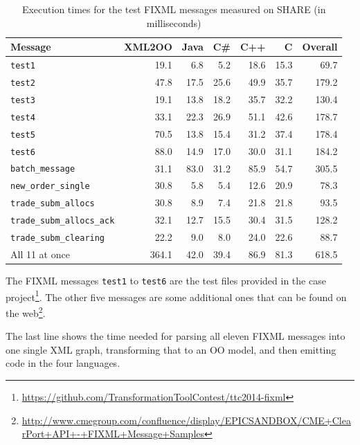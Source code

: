 \documentclass[a4paper]{article}
\begin{document}
\begin{table}[h!t]
  \centering
  \begin{tabular}{| l | r | r | r | r | r | r |}
    \hline
    \textbf{Message} & \textbf{XML2OO} & \textbf{Java} & \textbf{C\#} & \textbf{C++} & \textbf{C} & \textbf{Overall}\\
    \hline
    \texttt{test1}                    & 19.1  & 6.8  & 5.2  & 18.6 & 15.3 & 69.7\\
    \texttt{test2}                    & 47.8  & 17.5 & 25.6 & 49.9 & 35.7 & 179.2\\
    \texttt{test3}                    & 19.1  & 13.8 & 18.2 & 35.7 & 32.2 & 130.4\\
    \texttt{test4}                    & 33.1  & 22.3 & 26.9 & 51.1 & 42.6 & 178.7\\
    \texttt{test5}                    & 70.5  & 13.8 & 15.4 & 31.2 & 37.4 & 178.4\\
    \texttt{test6}                    & 88.0  & 14.9 & 17.0 & 30.0 & 31.1 & 184.2\\
    \hline
    \texttt{batch\_message}           & 31.1  & 83.0 & 31.2 & 85.9 & 54.7 & 305.5\\
    \texttt{new\_order\_single}       & 30.8  & 5.8  & 5.4  & 12.6 & 20.9 & 78.3\\
    \texttt{trade\_subm\_allocs}      & 30.8  & 8.9  & 7.4  & 21.8 & 21.8 & 93.5\\
    \texttt{trade\_subm\_allocs\_ack} & 32.1  & 12.7 & 15.5 & 30.4 & 31.5 & 128.2\\
    \texttt{trade\_subm\_clearing}    & 22.2  & 9.0  & 8.0  & 24.0 & 22.6 & 88.7\\
    \hline
    All 11 at once                    & 364.1 & 42.0 & 39.4 & 86.9 & 81.3 & 618.5\\
    \hline
  \end{tabular}
  \caption{Execution times for the test FIXML messages measured on SHARE (in milliseconds)}
  \label{tab:exec-times}
\end{table}

The FIXML messages \texttt{test1} to \texttt{test6} are the test files provided
in the case
project\footnote{\url{https://github.com/TransformationToolContest/ttc2014-fixml}}.
The other five messages are some additional ones that can be found on the
web\footnote{\url{http://www.cmegroup.com/confluence/display/EPICSANDBOX/CME+ClearPort+API+-+FIXML+Message+Samples}}.

The last line shows the time needed for parsing all eleven FIXML messages into
one single XML graph, transforming that to an OO model, and then emitting code
in the four languages.
\end{document}
